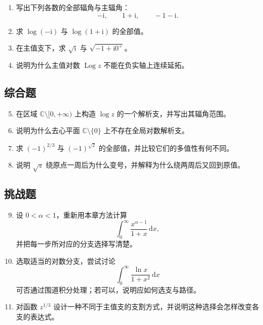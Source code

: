 \begin{enumerate}[label=\arabic*.]
    \item 写出下列各数的全部辐角与主辐角：
    \[
        -\mathrm{i},\qquad 1+\mathrm{i},\qquad -1-\mathrm{i}.
    \]
    \item 求 $\log(-\mathrm{i})$ 与 $\log(1+\mathrm{i})$ 的全部值。
    \item 在主值支下，求 $\sqrt{\mathrm{i}}$ 与 $\sqrt{-1+\mathrm{i}0^+}$。
    \item 说明为什么主值对数 $\operatorname{Log} z$ 不能在负实轴上连续延拓。
\end{enumerate}

\subsection*{综合题}

\begin{enumerate}[label=\arabic*.]
    \setcounter{enumi}{4}
    \item 在区域 $\mathbb{C}\setminus[0,+\infty)$ 上构造 $\log z$ 的一个解析支，并写出其辐角范围。
    \item 说明为什么去心平面 $\mathbb{C}\setminus\{0\}$ 上不存在全局对数解析支。
    \item 求 $(-1)^{2/3}$ 与 $(-1)^{\sqrt{2}}$ 的全部值，并比较它们的多值性有何不同。
    \item 说明 $\sqrt{z}$ 绕原点一周后为什么变号，并解释为什么绕两周后又回到原值。
\end{enumerate}

\subsection*{挑战题}

\begin{enumerate}[label=\arabic*.]
    \setcounter{enumi}{8}
    \item 设 $0<\alpha<1$，重新用本章方法计算
    \[
        \int_0^\infty \frac{x^{\alpha-1}}{1+x}\,\mathrm{d}x,
    \]
    并把每一步所对应的分支选择写清楚。
    \item 选取适当的对数分支，尝试讨论
    \[
        \int_0^\infty \frac{\ln x}{1+x^2}\,\mathrm{d}x
    \]
    可否通过围道积分处理；若可以，说明应如何选支与路径。
    \item 对函数 $z^{1/3}$ 设计一种不同于主值支的支割方式，并说明这种选择会怎样改变各支的表达式。
\end{enumerate}
